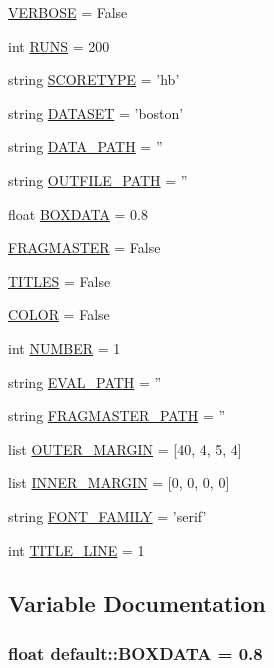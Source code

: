 \begin{CompactItemize}
\item 
\hyperlink{namespacedefault_faa31f8e93aab4e3c4ac7150c07a2163}{VERBOSE} = False
\item 
int \hyperlink{namespacedefault_5a47bc24cc2e81c2b486201e0150ed2d}{RUNS} = 200
\item 
string \hyperlink{namespacedefault_16c08c1aa9ed63675d727816602bd477}{SCORETYPE} = 'hb'
\item 
string \hyperlink{namespacedefault_050715858d86503e16fb8c76ba80f8ef}{DATASET} = 'boston'
\item 
string \hyperlink{namespacedefault_5f4c31e5e7cfc29df6f2858a2823e01e}{DATA\_\-PATH} = ''
\item 
string \hyperlink{namespacedefault_67f5df46d57b595458bd2b48834fa686}{OUTFILE\_\-PATH} = ''
\item 
float \hyperlink{namespacedefault_97d9d8ec55531a1738ba8e112b028503}{BOXDATA} = 0.8
\item 
\hyperlink{namespacedefault_6c7b3398123a66516eb33bdd5be92f72}{FRAGMASTER} = False
\item 
\hyperlink{namespacedefault_75efb1111f068d4ec2410c969f8e8163}{TITLES} = False
\item 
\hyperlink{namespacedefault_e15b6feffdfa11718d2f69bed850b8e5}{COLOR} = False
\item 
int \hyperlink{namespacedefault_afe0a3920f5df428cdac98ff509ecb64}{NUMBER} = 1
\item 
string \hyperlink{namespacedefault_a394b7f75e7cdba5f60003c6db292474}{EVAL\_\-PATH} = ''
\item 
string \hyperlink{namespacedefault_8d9fb97268090be4e6cec6c944f44a56}{FRAGMASTER\_\-PATH} = ''
\item 
list \hyperlink{namespacedefault_d933462cfca0c3f8181f44fc9f57060d}{OUTER\_\-MARGIN} = \mbox{[}40, 4, 5, 4\mbox{]}
\item 
list \hyperlink{namespacedefault_fb792579817a22922ee3388b3ab96b27}{INNER\_\-MARGIN} = \mbox{[}0, 0, 0, 0\mbox{]}
\item 
string \hyperlink{namespacedefault_9b4e126bc71dd911f1f777eb99e81064}{FONT\_\-FAMILY} = 'serif'
\item 
int \hyperlink{namespacedefault_38fe4c2b86af6bcf5c5a4b568a55b865}{TITLE\_\-LINE} = 1
\end{CompactItemize}


\subsection{Variable Documentation}
\hypertarget{namespacedefault_97d9d8ec55531a1738ba8e112b028503}{
\subsubsection[{BOXDATA}]{\setlength{\rightskip}{0pt plus 5cm}float {\bf default::BOXDATA} = 0.8}}
\label{namespacedefault_97d9d8ec55531a1738ba8e112b028503}


